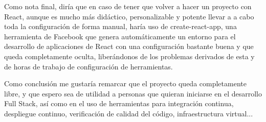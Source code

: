 Como nota final, diría que en caso de tener que volver a hacer un proyecto con React, aunque es mucho más didáctico, personalizable y potente llevar a a cabo toda la configuración de forma manual, haría uso de create-react-app, una herramienta de Facebook que genera automáticamente un entorno para el desarrollo de aplicaciones de React con una configuración bastante buena y que queda completamente oculta, liberándonos de los problemas derivados de esta y de horas de trabajo de configuración de herramientas.

Como conclusión me gustaría remarcar que el proyecto queda completamente libre, y que espero sea de utilidad a personas que quieran iniciarse en el desarrollo Full Stack, así como en el uso de herramientas para integración continua, despliegue continuo, verificación de calidad del código, infraestructura virtual...

